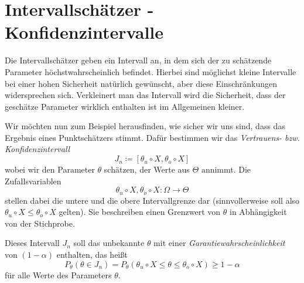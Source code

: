 
\section{Intervallschätzer - Konfidenzintervalle}
Die Intervallschätzer geben ein Intervall an, in dem sich der zu schätzende Parameter höchstwahrscheinlich befindet. Hierbei sind möglichst kleine Intervalle bei einer hohen Sicherheit natürlich gewünscht, aber diese Einschränkungen widersprechen sich. 
Verkleinert man das Intervall wird die Sicherheit, dass der geschätze Parameter wirklich enthalten ist im Allgemeinen kleiner.

Wir möchten nun zum Beispiel herausfinden, wie sicher wir uns sind, dass das Ergebnis eines Punktschätzers stimmt. Dafür bestimmen wir das \emph{Vertrauens- bzw. Konfidenzintervall}
\begin{equation*}
	J_n\coloneqq [\theta_u\circ X,\theta_o\circ X]
\end{equation*}
wobei wir den Parameter $\theta$ schätzen, der Werte aus $\Theta$ annimmt. Die Zufallsvariablen 
\begin{equation*}
	\theta_u\circ X,\theta_o\circ X: \Omega\rightarrow \Theta 
\end{equation*}
stellen dabei die untere und die obere Intervallgrenze dar (sinnvollerweise soll also $\theta_u\circ X\leq \theta_o\circ X$ gelten). Sie beschreiben einen Grenzwert von $\theta$ in Abhängigkeit von der Stichprobe.

Dieses Intervall $J_n$ soll das unbekannte $\theta$ mit einer \emph{Garantiewahrscheinlichkeit} von $(1-\alpha)$ enthalten, das heißt
\begin{equation}\label{eq:intervall}
	P_\theta (\theta\in J_n)=P_\theta(\theta_u\circ X\leq \theta\leq \theta_o\circ X)\geq 1-\alpha
\end{equation}
für alle Werte des Parameters $\theta$.


